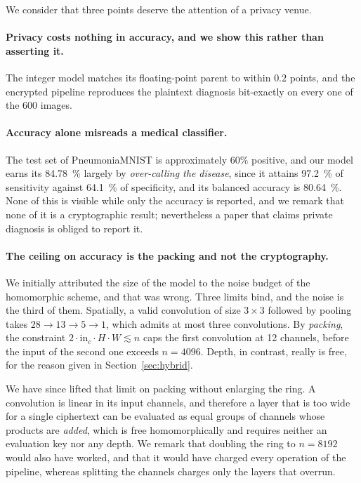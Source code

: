 \documentclass[11pt]{article}
\begin{document}
We consider that three points deserve the attention of a privacy venue.

\paragraph{Privacy costs nothing in accuracy, and we show this rather than asserting it.}
The integer model matches its floating-point parent to within $0.2$ points, and the encrypted
pipeline reproduces the plaintext diagnosis bit-exactly on every one of the 600 images.

\paragraph{Accuracy alone misreads a medical classifier.} The test set of PneumoniaMNIST is
approximately $60\%$ positive, and our model earns its \SI{84.78}{\percent} largely by
\emph{over-calling the disease}, since it attains \SI{97.2}{\percent} of sensitivity against
\SI{64.1}{\percent} of specificity, and its balanced accuracy is \SI{80.64}{\percent}. None of
this is visible while only the accuracy is reported, and we remark that none of it is a
cryptographic result; nevertheless a paper that claims private diagnosis is obliged to report
it.

\paragraph{The ceiling on accuracy is the packing and not the cryptography.} We initially
attributed the size of the model to the noise budget of the homomorphic scheme, and that was
wrong. Three limits bind, and the noise is the third of them. Spatially, a valid convolution of
size $3\times3$ followed by pooling takes $28 \to 13 \to 5 \to 1$, which admits at most three
convolutions. By \emph{packing}, the constraint $2\cdot \mathrm{in}_c \cdot H \cdot W \lesssim n$
caps the first convolution at 12 channels, before the input of the second one exceeds $n=4096$.
Depth, in contrast, really is free, for the reason given in Section~\ref{sec:hybrid}.

We have since lifted that limit on packing without enlarging the ring. A convolution is
linear in its input channels, and therefore a layer that is too wide for a single ciphertext can be
evaluated as equal groups of channels whose products are \emph{added}, which is free
homomorphically and requires neither an evaluation key nor any depth. We remark that doubling the
ring to $n=8192$ would also have worked, and that it would have charged every operation of the
pipeline, whereas splitting the channels charges only the layers that overrun.
\end{document}
